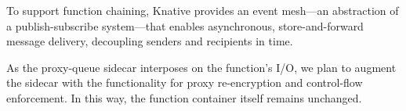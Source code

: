 To support function chaining, Knative provides an event mesh---an abstraction
of a publish-subscribe system---that enables asynchronous, store-and-forward
message delivery, decoupling senders and recipients in time.


%
As the proxy-queue sidecar interposes on the function's I/O, we plan to augment
the sidecar with the functionality for proxy re-encryption and control-flow
enforcement.
%
In this way, the function container itself remains unchanged.




